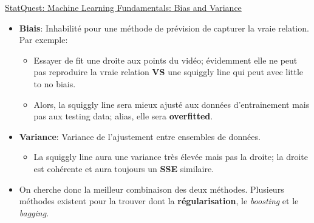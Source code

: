 \documentclass[12pt, titlepage, french]{report}
\begin{document}
\begin{YTB_SUMM}{\href{https://www.youtube.com/watch?v=EuBBz3bI-aA&list=PLblh5JKOoLUICTaGLRoHQDuF_7q2GfuJF&index=6}{StatQuest: Machine Learning Fundamentals: Bias and Variance}}
\begin{itemize}
	\item	\textbf{Biais}: Inhabilité pour une méthode de prévision de capturer la vraie relation. Par exemple:
	\begin{itemize}
		\item	Essayer de fit une droite aux points du vidéo; évidemment elle ne peut pas reproduire la vraie relation \textbf{VS} une squiggly line qui peut avec little to no biais.
		\item	Alors, la squiggly line sera mieux ajusté aux données d'entrainement mais pas aux testing data; alias, elle sera \textbf{overfitted}.
	\end{itemize}
	\item	\textbf{Variance}: Variance de l'ajustement entre ensembles de données.
	\begin{itemize}
		\item	La squiggly line aura une variance très élevée mais pas la droite; la droite est cohérente et aura toujours un \textbf{SSE} similaire.
	\end{itemize}
	\item	On cherche donc la meilleur combinaison des deux méthodes. Plusieurs méthodes existent pour la trouver dont la \textbf{régularisation}, le \textit{boosting} et le \textit{bagging}.
\end{itemize}
\end{YTB_SUMM}
\end{document}
